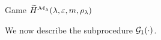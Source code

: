 \begin{AlgorithmBox}[label={pq:game:Htil}]{Game \textnormal{$\widetilde{H}^{\mathcal{M}_\lambda}(\lambda, \varepsilon,m,\rho_\lambda)$}}
\end{AlgorithmBox}


We now describe the subprocedure $\mathcal{G}_1(\cdot)$. 

